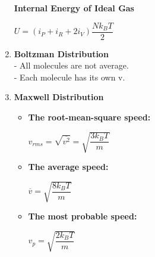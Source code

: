\documentclass[10pt]{article}
\begin{document}
\begin{enumerate}
	\textbf{Internal Energy of Ideal Gas}
	\begin{mybox}
	\begin{center}
	$U = (i_P + i_R + 2i_V) \dfrac{Nk_BT}{2}$
	\end{center}
	\end{mybox}
	\item \textbf{Boltzman Distribution}\\
	- All molecules are not average.\\
	- Each molecule has its own v.
	\item \textbf{Maxwell Distribution}\\
	\begin{itemize}
		\item  \textbf{The root-mean-square speed:}
		\begin{mybox}
		\begin{center}
		$v_{rms} = \sqrt{\overline{v^2}} = \sqrt{\dfrac{3k_BT}{m}}$
		\end{center}
		\end{mybox}
		\item \textbf{The average speed:}
		\begin{mybox}
		\begin{center}
		$\overline{v} = \sqrt{\dfrac{8k_BT}{m}}$
		\end{center}
		\end{mybox}
		\item \textbf{The most probable speed:}
		\begin{mybox}
		\begin{center}
		$v_{p}= \sqrt{\dfrac{2k_BT}{m}}$
		\end{center}
		\end{mybox}
	\end{itemize}		
\end{enumerate}	
\end{document}
